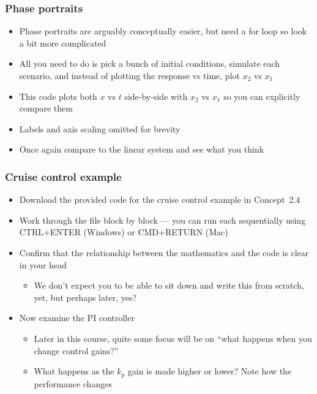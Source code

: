 \documentclass[9pt]{beamer-control}
\begin{document}
\begin{frame}
\frametitle{Phase portraits}
\begin{itemize}
\item
Phase portraits are arguably conceptually easier, but need a for loop so look a bit more complicated
\item
All you need to do is pick a bunch of initial conditions, simulate each scenario, and instead of plotting the response vs time, plot $x_2$ vs $x_1$
\item
This code plots both $x$ vs $t$ side-by-side with $x_2$ vs $x_1$  so you can explicitly compare them
\item
Labels and axis scaling omitted for brevity
\item
Once again compare to the linear system and see what you think
\end{itemize}


\end{frame}


\begin{frame}
\frametitle{Cruise control example}
\begin{itemize}
\item Download the provided code for the cruise control example in Concept~2.4
\item Work through the file block by block --- you can run each sequentially using CTRL+ENTER (Windows) or CMD+RETURN (Mac)
\item Confirm that the relationship between the mathematics and the code is clear in your head
\begin{itemize}
\item We don't expect you to be able to sit down and write this from scratch, yet, but perhaps later, yes?
\end{itemize}
\item Now examine the PI controller
\begin{itemize}
\item
Later in this course, quite some focus will be on ``what happens when you change control gains?''
\item
What happens as the $k_p$ gain is made higher or lower? Note how the performance changes
\end{itemize}
\end{itemize}
\end{frame}
\end{document}
